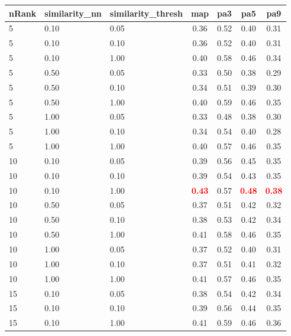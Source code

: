 \documentclass[12pt,a4paper,fleqn]{tufte-handout}
\begin{document}
 
\begin{table}              
\begin{center}              
\scriptsize              
\setlength{\tabcolsep}{.16667em}              
\begin{tabular}{lllcccc}              
nRank & similarity\_nn & similarity\_thresh & map & pa3 & pa5 & pa9 \\              
\hline              
5 & 0.10 & 0.05 & 0.36 & 0.52 & 0.40 & 0.31 \\              
5 & 0.10 & 0.10 & 0.36 & 0.52 & 0.40 & 0.31 \\              
5 & 0.10 & 1.00 & 0.40 & 0.58 & 0.46 & 0.34 \\              
5 & 0.50 & 0.05 & 0.33 & 0.50 & 0.38 & 0.29 \\              
5 & 0.50 & 0.10 & 0.34 & 0.51 & 0.39 & 0.30 \\              
5 & 0.50 & 1.00 & 0.40 & 0.59 & 0.46 & 0.35 \\              
5 & 1.00 & 0.05 & 0.33 & 0.48 & 0.38 & 0.30 \\              
5 & 1.00 & 0.10 & 0.34 & 0.54 & 0.40 & 0.28 \\              
5 & 1.00 & 1.00 & 0.40 & 0.57 & 0.46 & 0.35 \\              
10 & 0.10 & 0.05 & 0.39 & 0.56 & 0.45 & 0.35 \\              
10 & 0.10 & 0.10 & 0.39 & 0.54 & 0.43 & 0.35 \\              
10 & 0.10 & 1.00 & \textbf{\textcolor{red}{0.43}} & 0.57 & \textbf{\textcolor{red}{0.48}} & \textbf{\textcolor{red}{0.38}} \\              
10 & 0.50 & 0.05 & 0.37 & 0.51 & 0.42 & 0.32 \\              
10 & 0.50 & 0.10 & 0.38 & 0.53 & 0.42 & 0.34 \\              
10 & 0.50 & 1.00 & 0.41 & 0.58 & 0.46 & 0.35 \\              
10 & 1.00 & 0.05 & 0.37 & 0.52 & 0.40 & 0.31 \\              
10 & 1.00 & 0.10 & 0.37 & 0.51 & 0.41 & 0.32 \\              
10 & 1.00 & 1.00 & 0.41 & 0.57 & 0.46 & 0.35 \\              
15 & 0.10 & 0.05 & 0.38 & 0.54 & 0.42 & 0.34 \\              
15 & 0.10 & 0.10 & 0.39 & 0.56 & 0.44 & 0.35 \\              
15 & 0.10 & 1.00 & 0.41 & 0.59 & 0.46 & 0.36 \\              

\end{tabular}
\end{center}
\end{table}
\end{document}
